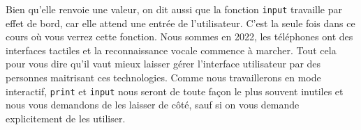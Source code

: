 \documentclass{magnolia}
\begin{document}
\noindent Bien qu'elle renvoie une valeur, on dit aussi que la fonction \verb_input_
travaille par effet de bord, car elle attend une entrée de l'utilisateur.
C'est la seule fois dans ce cours où vous verrez cette fonction. Nous sommes en
2022, les téléphones ont des interfaces tactiles et la reconnaissance vocale commence à
marcher. Tout cela pour vous dire qu'il vaut mieux laisser gérer l'interface utilisateur
par des personnes maitrisant ces technologies. Comme nous travaillerons en mode
interactif, \verb_print_ et \verb_input_ nous seront de toute façon le plus souvent inutiles et nous vous
demandons de les laisser de côté, sauf si on vous demande explicitement de les utiliser.











\end{document}

